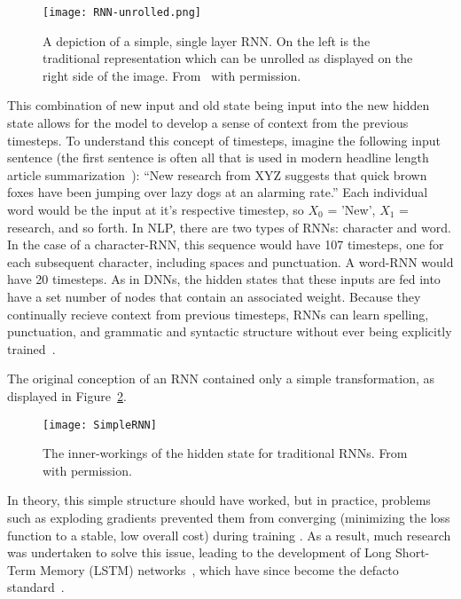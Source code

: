 \begin{figure}[h]
  \centering
  \texttt{[image: RNN-unrolled.png]}
  \caption[Single layer RNN]{A depiction of a simple, single layer RNN. On the left is the traditional representation which can be unrolled as displayed on the right side of the image. From~\cite{Olah2015} with permission.}
  \label{fig:rnn}
\end{figure}

This combination of new input and old state being input into the new hidden state allows for the model to develop a sense of context from the previous timesteps. To understand this concept of timesteps, imagine the following input sentence (the first sentence is often all that is used in modern headline length article summarization~\cite{Liu2016,Rush2015,Chopra2016,Nallapati2016a}): ``New research from XYZ suggests that quick brown foxes have been jumping over lazy dogs at an alarming rate.'' Each individual word would be the input at it's respective timestep, so $X_0$ = 'New', $X_1$ = research, and so forth. In NLP, there are two types of RNNs: character and word. In the case of a character-RNN, this sequence would have 107 timesteps, one for each subsequent character, including spaces and punctuation. A word-RNN would have 20 timesteps. As in DNNs, the hidden states that these inputs are fed into have a set number of nodes that contain an associated weight. Because they continually recieve context from previous timesteps, RNNs can learn spelling, punctuation, and grammatic and syntactic structure without ever being explicitly trained~\cite{Karpathy2015}.

The original conception of an RNN contained only a simple transformation, as displayed in Figure~\ref{fig:simprnn}.

\begin{figure}[h]
  \centering
  \texttt{[image: SimpleRNN]}
  \caption[RNN Mechanics]{The inner-workings of the hidden state for traditional RNNs. From~\cite{Olah2015} with permission.}
  \label{fig:simprnn}
\end{figure}

In theory, this simple structure should have worked, but in practice, problems such as exploding gradients prevented them from converging (minimizing the loss function to a stable, low overall cost) during training \cite{Hochreiter1991,Bengio1994}. As a result, much research was undertaken to solve this issue, leading to the development of Long Short-Term Memory (LSTM) networks~\cite{Hochreiter1997}, which have since become the defacto standard~\cite{Karpathy2015}.

